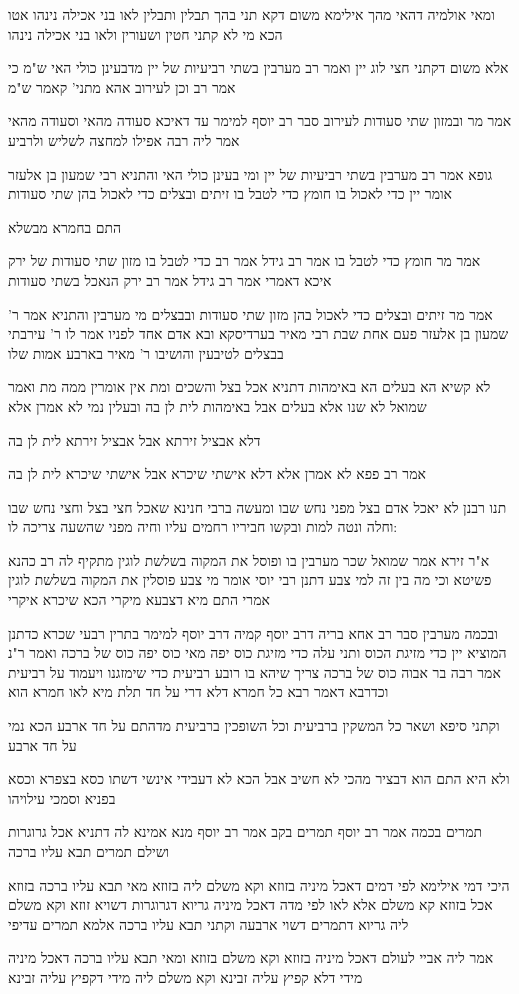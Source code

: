 \documentclass[12pt, openany]{book}
\newcommand{\sethebfont}{
\fontsize{10.5pt}{21.0pt} \selectfont
}
\newcommand{\textblock}[1]{
{\sethebfont #1\\}	
}
\begin{document}
\textblock{ומאי אולמיה דהאי מהך אילימא משום דקא תני בהך תבלין ותבלין לאו בני אכילה נינהו אטו הכא מי לא קתני חטין ושעורין ולאו בני אכילה נינהו}
\textblock{אלא משום דקתני חצי לוג יין ואמר רב מערבין בשתי רביעיות של יין מדבעינן כולי האי ש"מ כי אמר רב וכן לעירוב אהא מתני' קאמר ש"מ}
\textblock{אמר מר ובמזון שתי סעודות לעירוב סבר רב יוסף למימר עד דאיכא סעודה מהאי וסעודה מהאי אמר ליה רבה אפילו למחצה לשליש ולרביע}
\textblock{גופא אמר רב מערבין בשתי רביעיות של יין ומי בעינן כולי האי והתניא רבי שמעון בן אלעזר אומר יין כדי לאכול בו חומץ כדי לטבל בו זיתים ובצלים כדי לאכול בהן שתי סעודות}
\textblock{התם בחמרא מבשלא}
\textblock{אמר מר חומץ כדי לטבל בו אמר רב גידל אמר רב כדי לטבל בו מזון שתי סעודות של ירק איכא דאמרי אמר רב גידל אמר רב ירק הנאכל בשתי סעודות}
\textblock{אמר מר זיתים ובצלים כדי לאכול בהן מזון שתי סעודות ובבצלים מי מערבין והתניא אמר ר' שמעון בן אלעזר פעם אחת שבת רבי מאיר בערדיסקא ובא אדם אחד לפניו אמר לו ר' עירבתי בבצלים לטיבעין והושיבו ר' מאיר בארבע אמות שלו}
\textblock{לא קשיא הא בעלים הא באימהות דתניא אכל בצל והשכים ומת אין אומרין ממה מת ואמר שמואל לא שנו אלא בעלים אבל באימהות לית לן בה ובעלין נמי לא אמרן אלא}
\textblock{דלא אבציל זירתא אבל אבציל זירתא לית לן בה}
\textblock{אמר רב פפא לא אמרן אלא דלא אישתי שיכרא אבל אישתי שיכרא לית לן בה}
\textblock{תנו רבנן לא יאכל אדם בצל מפני נחש שבו ומעשה ברבי חנינא שאכל חצי בצל וחצי נחש שבו וחלה ונטה למות ובקשו חביריו רחמים עליו וחיה מפני שהשעה צריכה לו:}
\textblock{א"ר זירא אמר שמואל שכר מערבין בו ופוסל את המקוה בשלשת לוגין מתקיף לה רב כהנא פשיטא וכי מה בין זה למי צבע דתנן רבי יוסי אומר מי צבע פוסלין את המקוה בשלשת לוגין אמרי התם מיא דצבעא מיקרי הכא שיכרא איקרי}
\textblock{ובכמה מערבין סבר רב אחא בריה דרב יוסף קמיה דרב יוסף למימר בתרין רבעי שכרא כדתנן המוציא יין כדי מזיגת הכוס ותני עלה כדי מזיגת כוס יפה מאי כוס יפה כוס של ברכה ואמר ר"נ אמר רבה בר אבוה כוס של ברכה צריך שיהא בו רובע רביעית כדי שימזגנו ויעמוד על רביעית וכדרבא דאמר רבא כל חמרא דלא דרי על חד תלת מיא לאו חמרא הוא}
\textblock{וקתני סיפא ושאר כל המשקין ברביעית וכל השופכין ברביעית מדהתם על חד ארבע הכא נמי על חד ארבע}
\textblock{ולא היא התם הוא דבציר מהכי לא חשיב אבל הכא לא דעבידי אינשי דשתו כסא בצפרא וכסא בפניא וסמכי עילויהו}
\textblock{תמרים בכמה אמר רב יוסף תמרים בקב אמר רב יוסף מנא אמינא לה דתניא אכל גרוגרות ושילם תמרים תבא עליו ברכה}
\textblock{היכי דמי אילימא לפי דמים דאכל מיניה בזוזא וקא משלם ליה בזוזא מאי תבא עליו ברכה בזוזא אכל בזוזא קא משלם אלא לאו לפי מדה דאכל מיניה גריוא דגרוגרות דשויא זוזא וקא משלם ליה גריוא דתמרים דשוי ארבעה וקתני תבא עליו ברכה אלמא תמרים עדיפי}
\textblock{אמר ליה אביי לעולם דאכל מיניה בזוזא וקא משלם בזוזא ומאי תבא עליו ברכה דאכל מיניה מידי דלא קפיץ עליה זבינא וקא משלם ליה מידי דקפיץ עליה זבינא}
\end{document}
